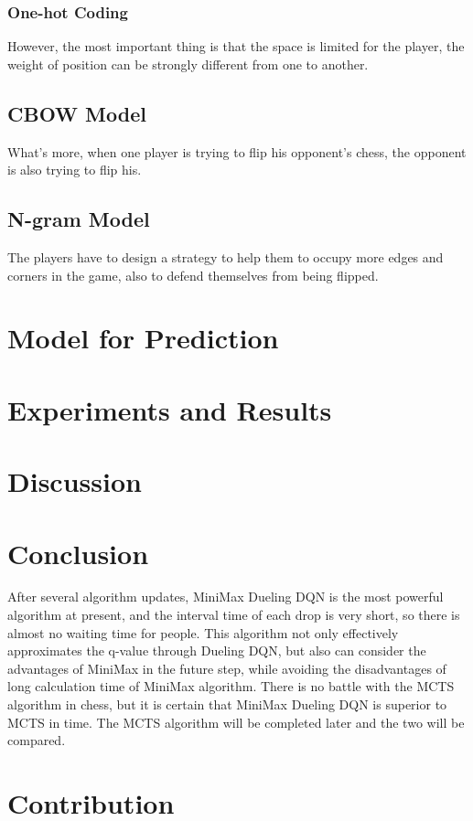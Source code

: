\documentclass[10pt,twocolumn,letterpaper]{article}
\begin{document}
\subsubsection{One-hot Coding}

However, the most important thing is that the space 
is limited for the player, the weight of position can 
be strongly different from one to another.

\subsection{CBOW Model}

What's more, when one player is trying to flip his 
opponent's chess, the opponent is also trying to flip 
his. 

\subsection{N-gram Model}

The players have to design a strategy to help them 
to occupy more edges and corners in the game, also to 
defend themselves from being flipped.

\section{Model for Prediction}

\section{Experiments and Results}

\section{Discussion}

\section{Conclusion}
After several algorithm updates, MiniMax Dueling DQN is the most powerful algorithm at present, and the interval time of each drop is very short, so there is almost no waiting time for people. This algorithm not only effectively approximates the q-value through Dueling DQN, but also can consider the advantages of MiniMax in the future step, while avoiding the disadvantages of long calculation time of MiniMax algorithm. There is no battle with the MCTS algorithm in chess, but it is certain that MiniMax Dueling DQN is superior to MCTS in time. The MCTS algorithm will be completed later and the two will be compared.


\section{Contribution}


{\small


}
\end{document}
